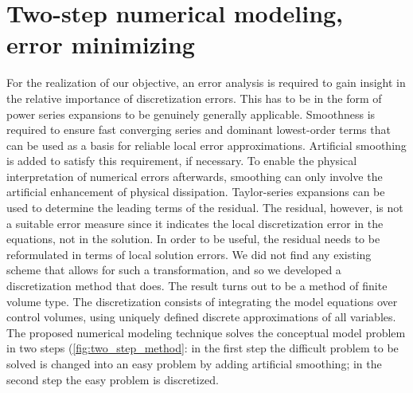 \chapter{Two-step numerical modeling, error minimizing}\label{sec:error_minimizing}

For the realization of our objective, an error analysis is required to gain insight in the relative importance of discretization errors.
This has to be in the form of power series expansions to be genuinely generally applicable.
Smoothness is required to ensure fast converging series and dominant lowest-order terms that can be used as a basis for reliable local error approximations.
Artificial smoothing is added to satisfy this requirement, if necessary.
To enable the physical interpretation of numerical errors afterwards, smoothing can only involve the artificial enhancement of physical dissipation.
Taylor-series expansions can be used to determine the leading terms of the residual.
The residual, however, is not a suitable error measure since it indicates the local discretization error in the equations, not in the solution.
In order to be useful, the residual needs to be reformulated in terms of local solution
errors.
We did not find any existing scheme that allows for such a transformation, and so we developed a discretization method that does.
The result turns out to be a method of finite volume type.
The discretization consists of integrating the model equations over control volumes, using uniquely defined discrete approximations of all variables.
The proposed numerical modeling technique solves the conceptual model problem in two steps (\autoref{fig:two_step_method}: in the first step the difficult problem to be solved is changed into an easy problem by adding artificial smoothing; in the second step the easy problem is discretized.

